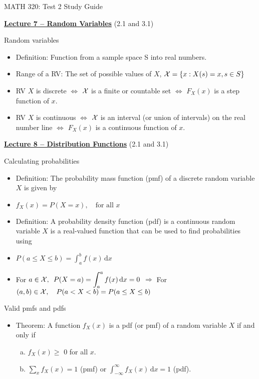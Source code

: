 \documentclass{article}
\newcommand{\bu}[1]{\textbf{\ul{#1}}}				%
\newcommand{\integral}[4]{\displaystyle \int_{#1}^{#2} #3 \,\mathrm{d} #4}		%
\begin{document}
\begin{center}
{\Huge MATH 320: Test 2 Study Guide}

\end{center}

\bigskip\bigskip

{\large \bu{Lecture 7 -- Random Variables}} (2.1 and 3.1)\bigskip

Random variables
\begin{itemize}
    \item Definition: Function from a sample space S into real numbers.
    \item Range of a RV: The set of possible values of $X$, ${\cal X} = \{x: X(s) = x, s \in S\}$
    \item RV $X$ is discrete $\Longleftrightarrow$ ${\cal X} $ is a finite or countable set $\Longleftrightarrow$ $F_X(x)$ is a step function of $x$.
    \item RV $X$ is continuous $\Longleftrightarrow$ ${\cal X} $ is an interval (or union of intervals) on the real number line $\Longleftrightarrow$ $F_X(x)$ is a continuous function of $x$.
\end{itemize}\vspace{80pt}

{\large \bu{Lecture 8 -- Distribution Functions}} (2.1 and 3.1)\bigskip

Calculating probabilities
\begin{itemize}
    \item Definition: The probability mass function (pmf) of a discrete random variable $X$ is given by
    \item[] $f_X(x) = P(X = x), \quad \text{for all } x$
    \item Definition: A probability density function (pdf) is a continuous random variable $X$ is a real-valued function that can be used to find probabilities using
    \item[] $P(a \le X \le b) = \integral{a}{b}{f(x)}{x}$
    \item[] For $a \in {\cal X}, \hspace{5pt} P(X = a) = \integral{a}{a}{f(x)}{x} = 0$ \hspace{5pt} $\Longrightarrow$ \hspace{5pt} For $(a, b) \in {\cal X}, \hspace{10pt} P(a < X < b) =  P(a \le X \le b)$
\end{itemize}\bigskip

Valid pmfs and pdfs
\begin{itemize}
    \item Theorem: A function $f_X(x)$ is a pdf (or pmf) of a random variable $X$ if and only if
    \begin{enumerate}[(a)]
        \item  $f_X(x) \ge $ 0 for all $x$.
        \item $\displaystyle \sum_x f_X(x) = 1$ (pmf) \hspace{20pt} or \hspace{20pt} $\integral{-\infty}{\infty} {f_X(x)}{x} = 1$ (pdf). 
    \end{enumerate}
\end{itemize}\bigskip
\end{document}
